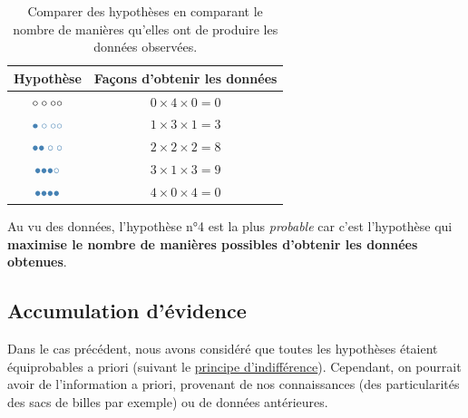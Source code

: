 \documentclass[
  a4paper,11pt,twoside,onecolumn,openright,final,oldfontcommands]{memoir}
\theoremstyle{definition}
\theoremstyle{definition}
\theoremstyle{definition}
\theoremstyle{remark}
\begin{document}
\begin{table}[!htb]

\begin{center}
\begin{threeparttable}

\caption{\label{tab:hypothesis-comparison}Comparer des hypothèses en comparant le nombre de manières qu'elles ont de produire les données observées.}

\begin{tabular}{cc}
\toprule
Hypothèse & Façons d'obtenir les données\\
\midrule
$\LARGE \circ \circ \circ \circ$ & $0 \times 4 \times 0 = 0$\\
$\LARGE \color{steelblue}{\bullet} \circ \circ \circ$ & $1 \times 3 \times 1 = 3$\\
$\LARGE \color{steelblue}{\bullet} \color{steelblue}{\bullet} \circ \circ$ & $2 \times 2 \times 2 = 8$\\
$\LARGE \color{steelblue}{\bullet} \color{steelblue}{\bullet} \color{steelblue}{\bullet} \circ$ & $3 \times 1 \times 3 = 9$\\
$\LARGE \color{steelblue}{\bullet} \color{steelblue}{\bullet} \color{steelblue}{\bullet} \color{steelblue}{\bullet}$ & $4 \times 0 \times 4 = 0$\\
\bottomrule
\end{tabular}

\end{threeparttable}
\end{center}

\end{table}

Au vu des données, l'hypothèse n°4 est la plus \emph{probable} car c'est l'hypothèse qui \textbf{maximise le nombre de manières possibles d'obtenir les données obtenues}.

\hypertarget{accumulation-duxe9vidence}{%
\subsection{Accumulation d'évidence}\label{accumulation-duxe9vidence}}

Dans le cas précédent, nous avons considéré que toutes les hypothèses étaient équiprobables a priori (suivant le \href{https://en.wikipedia.org/wiki/Principle_of_indifference}{principe d'indifférence}). Cependant, on pourrait avoir de l'information a priori, provenant de nos connaissances (des particularités des sacs de billes par exemple) ou de données antérieures.
\end{document}
